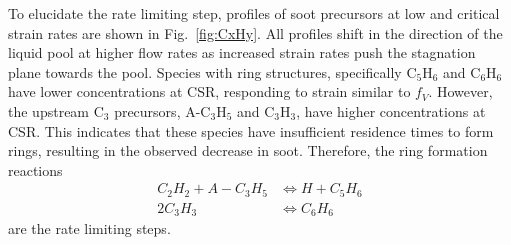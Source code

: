\documentclass[review,3p,times]{elsarticleUS}
\begin{document}
To elucidate the rate limiting step, profiles of soot precursors at low and critical strain rates are shown in Fig.~\ref{fig:CxHy}. All profiles shift in the direction of the liquid pool at higher flow rates as increased strain rates push the stagnation plane towards the pool. Species with ring structures, specifically C$_5$H$_6$ and C$_6$H$_6$ have lower concentrations at CSR, responding to strain similar to $f_V$. However, the upstream C$_3$ precursors, A-C$_3$H$_5$ and C$_3$H$_3$, have higher concentrations at CSR. This indicates that these species have insufficient residence times to form rings, resulting in the observed decrease in soot. Therefore, the ring formation reactions
\begin{align*}
  C_2H_2 + A-C_3H_5 &\Longleftrightarrow H + C_5H_6\\
  2 C_3H_3 &\Longleftrightarrow C_6H_6
\end{align*}
are the rate limiting steps.
\end{document}
